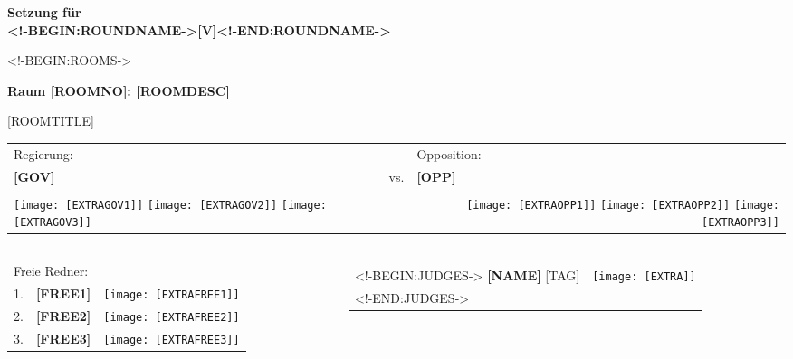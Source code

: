 \documentclass[ngerman,12pt]{beamer}
\begin{document}
\begin{frame}
  \vfill
  \begin{center}
    \huge\bfseries Setzung für\\
    <!-BEGIN:ROUNDNAME->[V]<!-END:ROUNDNAME->
  \end{center}  
  \vfill
\end{frame}


<!-BEGIN:ROOMS->
\begin{frame}
  \begin{center}
    {\large\bfseries Raum [ROOMNO]: [ROOMDESC]}
  \end{center}
  \vspace{-1em}
  \begin{center}
    [ROOMTITLE]
  \end{center}
  \begin{tabularx}{1\linewidth}{XcX}
    \multicolumn{1}{l}{\small Regierung:} & & \multicolumn{1}{l}{\small Opposition:}\\
    {\bfseries [GOV]} & vs. &
    {\bfseries [OPP]} \tabularnewline
    \multicolumn{3}{l}{\vspace{-0.5em}}\tabularnewline
    \multicolumn{1}{l}{
      \texttt{[image: [EXTRAGOV1]]}\hspace{0.5em}
      \texttt{[image: [EXTRAGOV2]]}\hspace{0.5em}
      \texttt{[image: [EXTRAGOV3]]}} & &
    \multicolumn{1}{r}{
      \texttt{[image: [EXTRAOPP1]]}\hspace{0.5em}
      \texttt{[image: [EXTRAOPP2]]}\hspace{0.5em}
      \texttt{[image: [EXTRAOPP3]]}}
  \end{tabularx}
  \begin{columns}[T]
    \begin{column}{0.5\linewidth}
      \begin{tabularx}{1.1\linewidth}{l>{\hsize=1.5\hsize\raggedright}X>{\hsize=0.5\hsize}X}
        \multicolumn{3}{l}{\small Freie Redner:}\tabularnewline
        1. & {\bfseries [FREE1]} &
        \texttt{[image: [EXTRAFREE1]]}\tabularnewline 
        2. & {\bfseries [FREE2]} &
        \texttt{[image: [EXTRAFREE2]]}\tabularnewline 
        3. & {\bfseries [FREE3]} &
        \texttt{[image: [EXTRAFREE3]]}\tabularnewline 
      \end{tabularx}      
    \end{column}
    \begin{column}{0.5\linewidth}
      \begin{tabularx}{1.15\linewidth}{>{\hsize=1.5\hsize\raggedright}X>{\hsize=0.5\hsize}X}
        \multicolumn{2}{l}{\small Juroren:}\tabularnewline
        <!-BEGIN:JUDGES->
        \small{\bfseries [NAME]} [TAG] &
        \texttt{[image: [EXTRA]]} \tabularnewline 
        <!-END:JUDGES->
      \end{tabularx}
    \end{column}
  \end{columns}
\end{frame}
\end{document}
